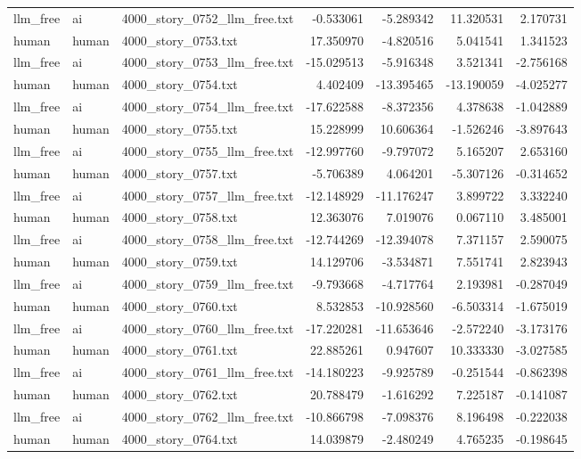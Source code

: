\begin{longtable}{lllrrrr}
llm\_free & ai & 4000\_story\_0752\_llm\_free.txt & -0.533061 & -5.289342 & 11.320531 & 2.170731 \\
human & human & 4000\_story\_0753.txt & 17.350970 & -4.820516 & 5.041541 & 1.341523 \\
llm\_free & ai & 4000\_story\_0753\_llm\_free.txt & -15.029513 & -5.916348 & 3.521341 & -2.756168 \\
human & human & 4000\_story\_0754.txt & 4.402409 & -13.395465 & -13.190059 & -4.025277 \\
llm\_free & ai & 4000\_story\_0754\_llm\_free.txt & -17.622588 & -8.372356 & 4.378638 & -1.042889 \\
human & human & 4000\_story\_0755.txt & 15.228999 & 10.606364 & -1.526246 & -3.897643 \\
llm\_free & ai & 4000\_story\_0755\_llm\_free.txt & -12.997760 & -9.797072 & 5.165207 & 2.653160 \\
human & human & 4000\_story\_0757.txt & -5.706389 & 4.064201 & -5.307126 & -0.314652 \\
llm\_free & ai & 4000\_story\_0757\_llm\_free.txt & -12.148929 & -11.176247 & 3.899722 & 3.332240 \\
human & human & 4000\_story\_0758.txt & 12.363076 & 7.019076 & 0.067110 & 3.485001 \\
llm\_free & ai & 4000\_story\_0758\_llm\_free.txt & -12.744269 & -12.394078 & 7.371157 & 2.590075 \\
human & human & 4000\_story\_0759.txt & 14.129706 & -3.534871 & 7.551741 & 2.823943 \\
llm\_free & ai & 4000\_story\_0759\_llm\_free.txt & -9.793668 & -4.717764 & 2.193981 & -0.287049 \\
human & human & 4000\_story\_0760.txt & 8.532853 & -10.928560 & -6.503314 & -1.675019 \\
llm\_free & ai & 4000\_story\_0760\_llm\_free.txt & -17.220281 & -11.653646 & -2.572240 & -3.173176 \\
human & human & 4000\_story\_0761.txt & 22.885261 & 0.947607 & 10.333330 & -3.027585 \\
llm\_free & ai & 4000\_story\_0761\_llm\_free.txt & -14.180223 & -9.925789 & -0.251544 & -0.862398 \\
human & human & 4000\_story\_0762.txt & 20.788479 & -1.616292 & 7.225187 & -0.141087 \\
llm\_free & ai & 4000\_story\_0762\_llm\_free.txt & -10.866798 & -7.098376 & 8.196498 & -0.222038 \\
human & human & 4000\_story\_0764.txt & 14.039879 & -2.480249 & 4.765235 & -0.198645 \\

\end{longtable}
